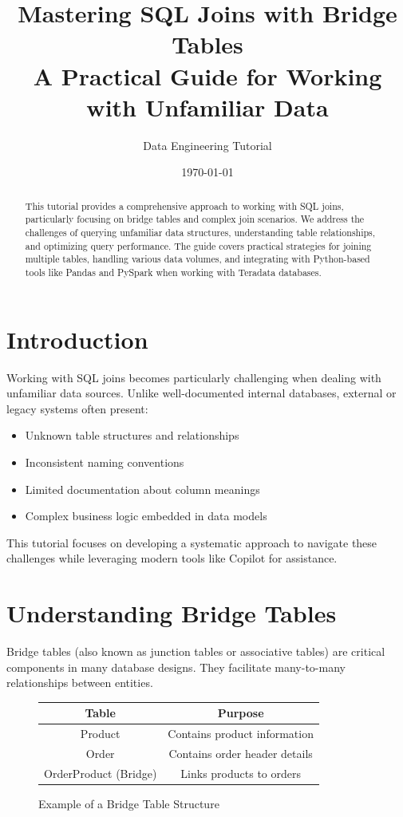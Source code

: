 \documentclass{article}
\title{Mastering SQL Joins with Bridge Tables \\ \large A Practical Guide for Working with Unfamiliar Data}
\author{Data Engineering Tutorial}
\date{\today}
\begin{document}
	
	\maketitle
	
	\begin{abstract}
		This tutorial provides a comprehensive approach to working with SQL joins, particularly focusing on bridge tables and complex join scenarios. We address the challenges of querying unfamiliar data structures, understanding table relationships, and optimizing query performance. The guide covers practical strategies for joining multiple tables, handling various data volumes, and integrating with Python-based tools like Pandas and PySpark when working with Teradata databases.
	\end{abstract}
	
	\section{Introduction}
	
	Working with SQL joins becomes particularly challenging when dealing with unfamiliar data sources. Unlike well-documented internal databases, external or legacy systems often present:
	
	\begin{itemize}
		\item Unknown table structures and relationships
		\item Inconsistent naming conventions
		\item Limited documentation about column meanings
		\item Complex business logic embedded in data models
	\end{itemize}
	
	This tutorial focuses on developing a systematic approach to navigate these challenges while leveraging modern tools like Copilot for assistance.
	
	\section{Understanding Bridge Tables}
	
	Bridge tables (also known as junction tables or associative tables) are critical components in many database designs. They facilitate many-to-many relationships between entities.
	
	\begin{figure}[h]
		\centering
		\begin{tabular}{|c|c|}
			\hline
			\textbf{Table} & \textbf{Purpose} \\
			\hline
			Product & Contains product information \\
			Order & Contains order header details \\
			OrderProduct (Bridge) & Links products to orders \\
			\hline
		\end{tabular}
		\caption{Example of a Bridge Table Structure}
		\label{fig:bridge}
	\end{figure}
	
\end{document}
